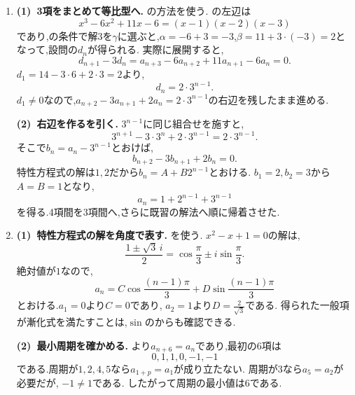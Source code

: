 \begin{enumerate}[label=\textbf{問\arabic*.},leftmargin=3.8em,format=\bookitemlink{practice-special}{solution}{problem}]
    \smallskip
    \textbf{(2)~を足して戻す.}
    $e_n=a_{n+1}-a_n$とおくと,
    \[
      e_{n+1}-e_n=d_n=6n+6,
    \]
    かつ$e_1=9-2=7$である.したがって,
    \begin{align*}
      e_n&=7+\sum_{k=1}^{n-1}(6k+6)\\
      &=3n^2+3n+1.
    \end{align*}
    もう一度足せば,
    \begin{align*}
      a_n&=2+\sum_{k=1}^{n-1}(3k^2+3k+1)\\
      &=n^3+1.
    \end{align*}
    ここでは$n=1$の空の和を$0$とする.
    初期値を$d_1,e_1,a_1$の順に使った.
    で次数を下げ,和で元へ戻す.
  \item \textbf{(1)~3項をまとめて等比型へ.}
    の方法を使う.
    の左辺は
    \[
      x^3-6x^2+11x-6=(x-1)(x-2)(x-3)
    \]
    であり,の条件で解$3$を$\gamma$に選ぶと,$\alpha=-6+3=-3$,$\beta=11+3\cdot(-3)=2$となって,設問の$d_n$が得られる.
    実際に展開すると,
    \[
      d_{n+1}-3d_n
      =a_{n+3}-6a_{n+2}+11a_{n+1}-6a_n=0.
    \]
    $d_1=14-3\cdot6+2\cdot3=2$より,
    \[
      d_n=2\cdot3^{n-1}.
    \]
    $d_1\ne0$なので,$a_{n+2}-3a_{n+1}+2a_n=2\cdot3^{n-1}$の右辺を残したまま進める.

    \smallskip
    \textbf{(2)~右辺を作るを引く.}
    $3^{n-1}$に同じ組合せを施すと,
    \[
      3^{n+1}-3\cdot3^n+2\cdot3^{n-1}=2\cdot3^{n-1}.
    \]
    そこで$b_n=a_n-3^{n-1}$とおけば,
    \[
      b_{n+2}-3b_{n+1}+2b_n=0.
    \]
    特性方程式の解は$1,2$だから$b_n=A+B2^{n-1}$とおける.
    $b_1=2,b_2=3$から$A=B=1$となり,
    \[
      a_n=1+2^{n-1}+3^{n-1}
    \]
    を得る.4項間を3項間へ,さらに既習の解法へ順に帰着させた.
  \item \textbf{(1)~特性方程式の解を角度で表す.}
    を使う.
    $x^2-x+1=0$の解は,
    \[
      \frac{1\pm\sqrt3\,i}{2}
      =\cos\frac\pi3\pm i\sin\frac\pi3.
    \]
    絶対値が$1$なので,
    \[
      a_n=C\cos\frac{(n-1)\pi}{3}
      +D\sin\frac{(n-1)\pi}{3}
    \]
    とおける.$a_1=0$より$C=0$であり,
    $a_2=1$より$D=\frac2{\sqrt3}$である.
    得られた一般項が漸化式を満たすことは,$\sin$のからも確認できる.

    \smallskip
    \textbf{(2)~最小周期を確かめる.}
    より$a_{n+6}=a_n$であり,最初の6項は
    \[
      0,1,1,0,-1,-1
    \]
    である.周期が$1,2,4,5$なら$a_{1+p}=a_1$が成り立たない.
    周期が$3$なら$a_5=a_2$が必要だが,
    $-1\ne1$である.
    したがって周期の最小値は$6$である.


\end{enumerate}
